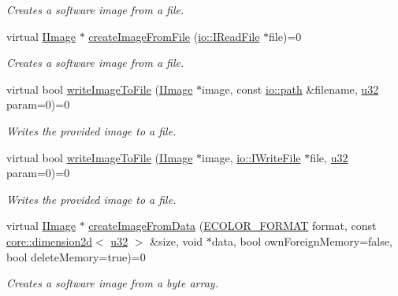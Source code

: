 \begin{DoxyCompactItemize}
\begin{DoxyCompactList}\small\item\em Creates a software image from a file. \end{DoxyCompactList}\item 
virtual \hyperlink{classirr_1_1video_1_1IImage}{I\+Image} $\ast$ \hyperlink{classirr_1_1video_1_1IVideoDriver_a322c41fa08c1da9de4633cf8a1e68607}{create\+Image\+From\+File} (\hyperlink{classirr_1_1io_1_1IReadFile}{io\+::\+I\+Read\+File} $\ast$file)=0
\begin{DoxyCompactList}\small\item\em Creates a software image from a file. \end{DoxyCompactList}\item 
virtual bool \hyperlink{classirr_1_1video_1_1IVideoDriver_a407d6a1483f995060035340e0a92ce9b}{write\+Image\+To\+File} (\hyperlink{classirr_1_1video_1_1IImage}{I\+Image} $\ast$image, const \hyperlink{namespaceirr_1_1io_a6468281622ce3a1c46b72e19f32dded5}{io\+::path} \&filename, \hyperlink{namespaceirr_a0416a53257075833e7002efd0a18e804}{u32} param=0)=0
\begin{DoxyCompactList}\small\item\em Writes the provided image to a file. \end{DoxyCompactList}\item 
virtual bool \hyperlink{classirr_1_1video_1_1IVideoDriver_ae12c362cfbc92a7c59b434666c8436c0}{write\+Image\+To\+File} (\hyperlink{classirr_1_1video_1_1IImage}{I\+Image} $\ast$image, \hyperlink{classirr_1_1io_1_1IWriteFile}{io\+::\+I\+Write\+File} $\ast$file, \hyperlink{namespaceirr_a0416a53257075833e7002efd0a18e804}{u32} param=0)=0
\begin{DoxyCompactList}\small\item\em Writes the provided image to a file. \end{DoxyCompactList}\item 
virtual \hyperlink{classirr_1_1video_1_1IImage}{I\+Image} $\ast$ \hyperlink{classirr_1_1video_1_1IVideoDriver_a425d60f2fcad42d8a79c33c587f41a06}{create\+Image\+From\+Data} (\hyperlink{namespaceirr_1_1video_a1d5e487888c32b1674a8f75116d829ed}{E\+C\+O\+L\+O\+R\+\_\+\+F\+O\+R\+M\+AT} format, const \hyperlink{classirr_1_1core_1_1dimension2d}{core\+::dimension2d}$<$ \hyperlink{namespaceirr_a0416a53257075833e7002efd0a18e804}{u32} $>$ \&size, void $\ast$data, bool own\+Foreign\+Memory=false, bool delete\+Memory=true)=0
\begin{DoxyCompactList}\small\item\em Creates a software image from a byte array. \end{DoxyCompactList}\item 

\end{DoxyCompactItemize}
